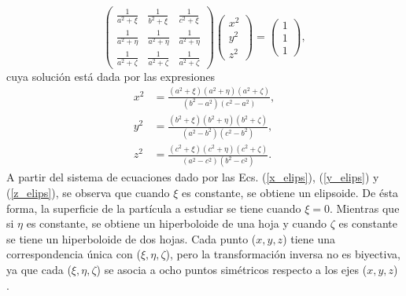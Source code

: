 	\begin{equation*}
		\begin{pmatrix}
			\frac{1}{a^2+\xi} & \frac{1}{b^2+\xi} & \frac{1}{c^2+\xi}\\
			\frac{1}{a^2+\eta} & \frac{1}{a^2+\eta} & \frac{1}{a^2+\eta}\\
			\frac{1}{a^2+\zeta} & \frac{1}{a^2+\zeta} & \frac{1}{a^2+\zeta}\end{pmatrix}\begin{pmatrix}
			x^2\\
			y^2\\
			z^2
		\end{pmatrix}=\begin{pmatrix}
			1\\
			1\\
			1
		\end{pmatrix},
	\end{equation*}
%	
cuya solución está dada por las expresiones
\begin{align}
	x^2&=\frac{(a^2+\xi)(a^2+\eta)(a^2+\zeta)}{(b^2-a^2)(c^2-a^2)},\label{x_elips}\\
	y^2&=\frac{(b^2+\xi)(b^2+\eta)(b^2+\zeta)}{(a^2-b^2)(c^2-b^2)},\label{y_elips}\\
	z^2&=\frac{(c^2+\xi)(c^2+\eta)(c^2+\zeta)}{(a^2-c^2)(b^2-c^2)}. \label{z_elips}    
\end{align}
A partir del sistema de ecuaciones dado por las Ecs. (\ref{x_elips}), (\ref{y_elips}) y (\ref{z_elips}), se observa que cuando $\xi$ es constante, se obtiene un elipsoide. De ésta forma, la superficie de la partícula a estudiar se tiene cuando $\xi=0$. Mientras que si $\eta$ es constante, se obtiene un hiperboloide de una hoja y cuando $\zeta$ es constante se tiene un hiperboloide de dos hojas. Cada punto ($x,y,z$) tiene una correspondencia única con ($\xi,\eta,\zeta$), pero la transformación inversa no es biyectiva, ya que cada ($\xi,\eta,\zeta$) se asocia a ocho puntos simétricos respecto a los ejes ($x,y,z$) \cite{Cambdrige}. \\

